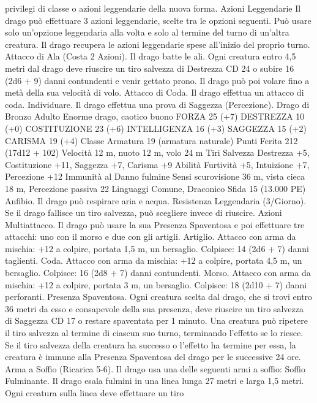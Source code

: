 \begin{multicols}{2}
privilegi di classe o azioni leggendarie della nuova forma.
Azioni Leggendarie
Il drago può effettuare 3 azioni leggendarie, scelte tra le opzioni
seguenti. Può usare solo un’opzione leggendaria alla volta e solo
al termine del turno di un’altra creatura. Il drago recupera le
azioni leggendarie spese all’inizio del proprio turno.
Attacco di Ala (Costa 2 Azioni). Il drago batte le ali. Ogni
creatura entro 4,5 metri dal drago deve riuscire un tiro salvezza
di Destrezza CD 24 o subire 16 (2d6 + 9) danni contundenti e
venir gettato prono. Il drago può poi volare fino a metà della sua
velocità di volo.
Attacco di Coda. Il drago effettua un attacco di coda.
Individuare. Il drago effettua una prova di Saggezza
(Percezione).
Drago di Bronzo Adulto
Enorme drago, caotico buono
FORZA 25 (+7)
DESTREZZA 10 (+0)
COSTITUZIONE 23 (+6)
INTELLIGENZA 16 (+3)
SAGGEZZA 15 (+2)
CARISMA 19 (+4)
Classe Armatura 19 (armatura naturale)
Punti Ferita 212 (17d12 + 102)
Velocità 12 m, nuoto 12 m, volo 24 m
Tiri Salvezza Destrezza +5, Costituzione +11, Saggezza +7,
Carisma +9
Abilità Furtività +5, Intuizione +7, Percezione +12
Immunità al Danno fulmine
Sensi scurovisione 36 m, vista cieca 18 m, Percezione passiva 22
Linguaggi Comune, Draconico
Sfida 15 (13.000 PE)
Anfibio. Il drago può respirare aria e acqua.
Resistenza Leggendaria (3/Giorno). Se il drago fallisce un tiro
salvezza, può scegliere invece di riuscire.
Azioni
Multiattacco. Il drago può usare la sua Presenza Spaventosa e
poi effettuare tre attacchi: uno con il morso e due con gli artigli.
Artiglio. Attacco con arma da mischia: +12 a colpire, portata 1,5
m, un bersaglio.
Colpisce: 14 (2d6 + 7) danni taglienti.
Coda. Attacco con arma da mischia: +12 a colpire, portata 4,5
m, un bersaglio.
Colpisce: 16 (2d8 + 7) danni contundenti.
Morso. Attacco con arma da mischia: +12 a colpire, portata 3 m,
un bersaglio.
Colpisce: 18 (2d10 + 7) danni perforanti.
Presenza Spaventosa. Ogni creatura scelta dal drago, che si trovi
entro 36 metri da esso e consapevole della sua presenza, deve
riuscire un tiro salvezza di Saggezza CD 17 o restare spaventata per
1 minuto. Una creatura può ripetere il tiro salvezza al termine di
ciascun suo turno, terminando l’effetto se lo riesce. Se il tiro salvezza
della creatura ha successo o l’effetto ha termine per essa, la creatura è
immune alla Presenza Spaventosa del drago per le successive 24 ore.
Arma a Soffio (Ricarica 5-6). Il drago usa una delle seguenti armi
a soffio:
Soffio Fulminante. Il drago esala fulmini in una linea lunga 27 metri
e larga 1,5 metri. Ogni creatura sulla linea deve effettuare un tiro

\end{multicols}
